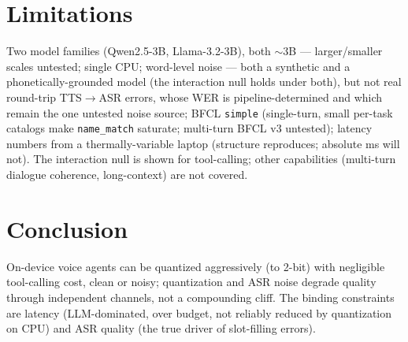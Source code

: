 \documentclass[11pt]{article}
\newcommand{\code}[1]{\texttt{#1}}
\begin{document}
\section{Limitations}
Two model families (Qwen2.5-3B, Llama-3.2-3B), both ${\sim}3$B --- larger/smaller scales
untested; single CPU; word-level noise --- both a synthetic and a phonetically-grounded
model (the interaction null holds under both), but not real round-trip
TTS$\rightarrow$ASR errors, whose WER is pipeline-determined and which remain the one
untested noise source; BFCL \code{simple} (single-turn, small per-task catalogs make
\code{name\_match} saturate; multi-turn BFCL v3 untested); latency numbers from a
thermally-variable laptop (structure reproduces; absolute ms will not). The interaction
null is shown for tool-calling; other capabilities (multi-turn dialogue coherence,
long-context) are not covered.

\section{Conclusion}
On-device voice agents can be quantized aggressively (to 2-bit) with negligible
tool-calling cost, clean or noisy; quantization and ASR noise degrade quality through
independent channels, not a compounding cliff. The binding constraints are latency
(LLM-dominated, over budget, not reliably reduced by quantization on CPU) and ASR
quality (the true driver of slot-filling errors).
\end{document}
